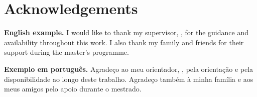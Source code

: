 
\chapter*{Acknowledgements}

\noindent\textbf{English example.}
I would like to thank my supervisor, \supervisorname, for the guidance and
availability throughout this work. I also thank my family and friends for
their support during the master's programme.

\bigskip

\begin{otherlanguage}{portuguese}
\noindent\textbf{Exemplo em português.}
Agradeço ao meu orientador, \supervisorname, pela orientação e pela
disponibilidade ao longo deste trabalho. Agradeço também à minha família e
aos meus amigos pelo apoio durante o mestrado.
\end{otherlanguage}


